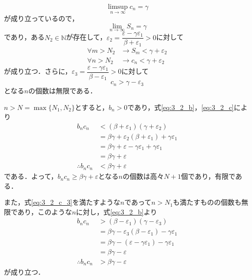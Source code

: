 \begin{enumerate}[(1)]
\begin{enumerate}[(i)]
        \begin{equation}
            \limsup_{n\to\infty}c_n=\gamma
        \end{equation}
        が成り立っているので，
        \begin{equation}
            \lim_{n\to\infty}S_n=\gamma
        \end{equation}
        であり，ある$N_2\in\mathbb{N}$が存在して，$\varepsilon_2=\dfrac{\varepsilon-\gamma\varepsilon_1}{\beta+\varepsilon_1}>0$に対して
        \begin{align}
            \forall m>N_2&\to S_m<\gamma+\varepsilon_2\\
            \forall n>N_2&\to c_n<\gamma+\varepsilon_2\label{eq:3_2_c}
        \end{align}
        が成り立つ．さらに，$\varepsilon_3=\dfrac{\varepsilon-\gamma\varepsilon_1}{\beta-\varepsilon_1}>0$に対して
        \begin{equation}
            c_n>\gamma-\varepsilon_3\label{eq:3_2_c_3}
        \end{equation}
        となる$n$の個数は無限である．

        $n>N=\max\{N_1,N_2\}$とすると，$b_n>0$であり，式\eqref{eq:3_2_b}，\eqref{eq:3_2_c}により
        \begin{align}
            b_nc_n 
            &< (\beta + \varepsilon_1)(\gamma+\varepsilon_2)\\
            &= \beta\gamma + \varepsilon_2(\beta+\varepsilon_1)+\gamma\varepsilon_1\\
            &= \beta\gamma + \varepsilon-\gamma\varepsilon_1+\gamma\varepsilon_1\\
            &= \beta\gamma + \varepsilon\\
            \therefore b_nc_n
            &< \beta\gamma + \varepsilon
        \end{align}
        である．よって，$b_nc_n \ge\beta\gamma + \varepsilon$となる$n$の個数は高々$N+1$個であり，有限である．

        また，式\eqref{eq:3_2_c_3}を満たすような$n$であって$n>N_1$も満たすものの個数も無限であり，このような$n$に対し，式\eqref{eq:3_2_b}より
        \begin{align}
            b_nc_n 
            &> (\beta-\varepsilon_1)(\gamma-\varepsilon_3)\\
            &=\beta\gamma - \varepsilon_3(\beta-\varepsilon_1)-\gamma\varepsilon_1\\
            &=\beta\gamma - (\varepsilon-\gamma\varepsilon_1)-\gamma\varepsilon_1\\
            &=\beta\gamma - \varepsilon\\
            \therefore b_nc_n 
            &> \beta\gamma - \varepsilon
        \end{align}
        が成り立つ．


\end{enumerate}
\end{enumerate}
